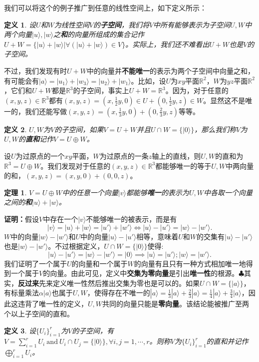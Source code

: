 \documentclass[mathserif,hyperref,UTF8,openany,b5paper]{ctexbook}
\newtheorem{defn}{定义}[section]
\newtheorem{thm}{定理}[section]
\begin{document}
我们可以将这个的例子推广到任意的线性空间上，如下定义所示：
\begin{defn}
设$U$和$W$为线性空间$V$的\textbf{子空间}，我们将$V$中所有能够表示为子空间$U,W$中两个向量$|u\rangle, |w\rangle$之\textbf{和}的向量所组成的集合记作$U+W = \{|u\rangle + |w\rangle|  \forall(|u\rangle + |w\rangle)\in V\}$。实际上，我们还不难看出$U+W$也是$V$的子空间。
\end{defn}

不过，我们发现有时$U+W$中的向量并\textbf{不能唯一}的表示为两个子空间中向量之和，有可能会有$|a\rangle = |u_1\rangle + |w_3\rangle = |u_2\rangle + |w_1\rangle$。比如，设$U$为$xy$平面$\mathbb{R}^2$，$W$为$yz$平面$\mathbb{R}^2$，它们和$U+W$都是$\mathbb{R}^3$的子空间，事实上$U+W=\mathbb{R}^3$。因为，对于任意的$(x,y,z)\in \mathbb{R}^3$都有$(x,y,z)=(x,\frac{1}{2}y,0)\in U+(0,\frac{1}{2}y,z)\in W$。显然这不是唯一的，我们还能写做$(x,y,z)=(x,\frac{1}{3}y,0)+(0,\frac{2}{3}y,z)$等等。
\begin{defn}
$U,W$为$V$的子空间，如果$V=U+W$并且$U\cap W =\{|0\rangle\}$，那么我们称$V$为$U,W$的\textbf{直和}记作$V = U\oplus W$。
\end{defn}

设$U$为过原点的一个$xy$平面，$W$为过原点的一条$z$轴上的直线，则$U,W$的直和为$\mathbb{R}^3 = U\oplus W$。我们发现对于任意的$(x,y,z)\in \mathbb{R}^3$都能够唯一的等于$U,W$中两向量的和，$(x,y,z)=(x,y,0)+(0,0,z)
$。
\begin{thm}
$V=U\oplus W$中的任意一个向量$|v\rangle$都能够\textbf{唯一}的表示为$U,W$中各取一个向量之间的\textbf{和}$|u\rangle + |w\rangle$。
\end{thm}

\textbf{证明：}假设$V$中存在一个$|v\rangle$不能够唯一的被表示，而是有
\begin{equation}
|v\rangle = |u\rangle + |w\rangle =|u'\rangle + |w'\rangle \Leftrightarrow |u\rangle - |u'\rangle  = |w\rangle  - |w'\rangle.
\end{equation}
$W$中的向量$|w\rangle  - |w'\rangle$和$U$中的向量$|u\rangle - |u'\rangle$相等，意味着$U$和$W$的交集有$|u\rangle - |u'\rangle $也是$ |w\rangle  - |w'\rangle$。不过根据定义，$U\cap W =\{|0\rangle\}$使得:
\begin{equation}
|u\rangle - |u'\rangle  = |w\rangle  - |w'\rangle = |0\rangle \implies |u\rangle = |u'\rangle ;|w\rangle = |w'\rangle.
\end{equation}
我们证明了一个属于$U$的向量和一个属于$W$的向量有且只有一种方式相加唯一地得到一个属于$V$的向量。由此可见，定义中\textbf{交集为零向量}是引出\textbf{唯一性}的根源。$\clubsuit$其实，\textbf{反过来}先来定义唯一性然后推出交集为零也是可以的。如果$U\cap W =\{|a\rangle\}$，有标量乘法$\alpha|a\rangle $也属于$U,W$，使得存在不唯一的$|a\rangle = \frac{1}{3}|a\rangle+\frac{2}{3}|a\rangle=\frac{1}{4}|a\rangle+\frac{3}{4}|a\rangle$，因此这违背了唯一性的定义，$U,W$共同的向量只能是\textbf{零向量}。该结论能被推广至两个以上子空间的直和。
\begin{defn}
设$\{U_i\}^r_{i=1}$为$V$的子空间，有$V=\sum^r_{i=1} U_i  \ \mbox{and}\  U_i \cap  U_j = \{|0\rangle\}, \forall i,j = 1,\cdots, r$。则称$V$为$\{U_i\}^r_{i=1}$的直和并记作$\bigoplus^r_{i=1}U_i$。
\end{defn}
\end{document}
